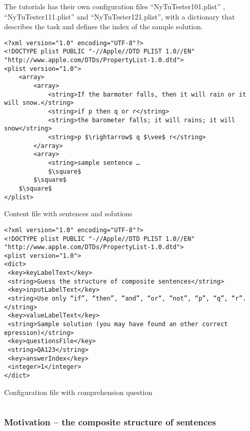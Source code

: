 The tutorials has their own configuration files “NyTuTester101.plist” ,
 “NyTuTester111.plist” and  “NyTuTester121.plist”, with a dictionary that
 describes the task and defines the index of the sample solution.


\begin{table}[htdp]
\begin{center}
\begin{lstlisting}[mathescape]
<?xml version="1.0" encoding="UTF-8"?>
<!DOCTYPE plist PUBLIC "-//Apple//DTD PLIST 1.0//EN" "http://www.apple.com/DTDs/PropertyList-1.0.dtd">
<plist version="1.0">
	<array>
		<array> 
			<string>If the barmoter falls, then it will rain or it will snow.</string>
			<string>if p then q or r</string>
			<string>the barometer falls; it will rains; it will snow</string>
			<string>p $\rightarrow$ q $\vee$ r</string>
		</array>
		<array>
			<string>sample sentence …
			$\square$
		$\square$
	$\square$
</plist>
\end{lstlisting}
\caption{Content file with sentences and solutions}
\end{center}
\label{tab:QA123}
\end{table}%

\begin{table}[htdp]
\begin{center}
\begin{lstlisting}[mathescape]
<?xml version="1.0" encoding="UTF-8"?>
<!DOCTYPE plist PUBLIC "-//Apple//DTD PLIST 1.0//EN" "http://www.apple.com/DTDs/PropertyList-1.0.dtd">
<plist version="1.0">
<dict>
 <key>keyLabelText</key>
 <string>Guess the structure of composite sentences</string>
 <key>inputLabelText</key>
 <string>Use only “if”, “then”, “and”, “or“, “not”, “p”, “q”, “r”.</string>
 <key>valueLabelText</key>
 <string>Sample solution (you may have found an other correct epression)</string>
 <key>questionsFile</key>
 <string>QA123</string>
 <key>answerIndex</key>
 <integer>1</integer>
</dict>
\end{lstlisting}
\caption{Configuration file with comprehension question}
\end{center}
\label{tab:PLIST101}
\end{table}%


\begin{verbatim}
\end{verbatim}

\subsubsection{Motivation – the composite structure of sentences}

